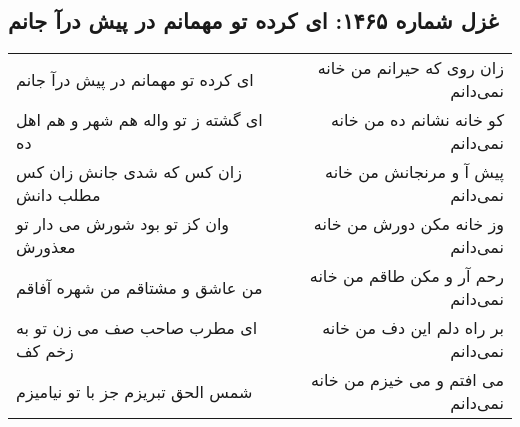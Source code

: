 \begin{center}
\section*{غزل شماره ۱۴۶۵: ای کرده تو مهمانم در پیش درآ جانم}
\label{sec:1465}
\begin{longtable}{l p{0.5cm} r}
ای کرده تو مهمانم در پیش درآ جانم
&&
زان روی که حیرانم من خانه نمی‌دانم
\\
ای گشته ز تو واله هم شهر و هم اهل ده
&&
کو خانه نشانم ده من خانه نمی‌دانم
\\
زان کس که شدی جانش زان کس مطلب دانش
&&
پیش آ و مرنجانش من خانه نمی‌دانم
\\
وان کز تو بود شورش می دار تو معذورش
&&
وز خانه مکن دورش من خانه نمی‌دانم
\\
من عاشق و مشتاقم من شهره آفاقم
&&
رحم آر و مکن طاقم من خانه نمی‌دانم
\\
ای مطرب صاحب صف می زن تو به زخم کف
&&
بر راه دلم این دف من خانه نمی‌دانم
\\
شمس الحق تبریزم جز با تو نیامیزم
&&
می افتم و می خیزم من خانه نمی‌دانم
\\
\end{longtable}
\end{center}
